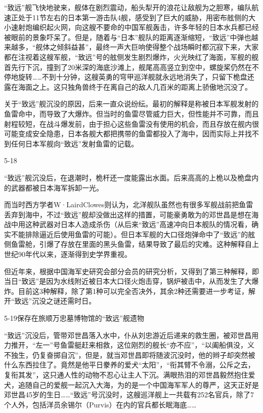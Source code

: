 \documentclass[12pt,UTF8]{ctexbook}
\begin{document}
“致远”舰飞快地驶来，舰体在剧烈震动，船头犁开的浪花让敌舰为之胆寒，编队航速正处于11节左右的日本第一游击队4舰，感受到了巨大的威胁，用密布舷侧的大小速射炮编织起火网，向这艘不要命的中国军舰轰击，许多年轻的日本水兵都已经被眼前的景象吓呆了。但是，随着与“日本”舰队的距离逐渐缩短，“致远”中弹也越来越多，“舰体之倾斜益甚”，最终一声大巨响使得整个战场瞬时都沉寂下来，大家都在注视着这艘军舰，“致远”号的舷侧发生剧烈爆炸，火光映红了海面，军舰的舰首先行下沉，撞到了20米深的海底沙滩上，舰尾高高竖立到空中，螺旋桨仍然在不停地旋转……不到十分钟，这艘英勇的穹甲巡洋舰就永远地消失了，只留下桅盘还露在海面之上。这只独角兽终于在离自己的敌人几百米的距离上骄傲地沉没了。


关于“致远”舰沉没的原因，后来一直众说纷纭。最初的解释是称被日本军舰发射的鱼雷命中，而导致了大爆炸。但当时的鱼雷尽管威力巨大，但性能并不可靠，而且射程较短，在战斗爆发前，由于担心这些鱼雷没有使用的机会，而且存放在舰内很可能变成安全隐患，日本各舰大都把携带的鱼雷都投入了海中，因而实际上并找不到任何日本军舰向“致远”发射鱼雷的记载。

5-18

“致远”舰沉没后，在退潮时，桅杆还一度能露出水面。后来高高的上桅以及桅盘内的武器都被日本海军拆卸一光。

而当时西方学者W·LairdClowes则认为，北洋舰队虽然也有很多军舰战前把鱼雷丢弃到海中，不过“致远”舰却没做出这样的措置，可能豪勇敢为的邓世昌是想在海战中用这种武器对日本人造成杀伤（从后来“致远”高速冲向日本舰队的情况看，确实不能排除逼近后使用鱼雷的可能）。但日本军舰的大口径炮弹命中了“致远”的舷侧鱼雷舱，引爆了存放在里面的黑头鱼雷，结果导致了最后的灾难。这种解释自上世纪90年代以来，逐渐得到史学界重视。

但近年来，根据中国海军史研究会部分会员的研究分析，又得到了第三种解释，即当日“致远”是因为水线附近被日本大口径火炮击穿，锅炉被击中，从而发生了大爆炸。目前这3种解释，除了第1种可以完全否决外，其余2种还需要进一步考证，解开“致远”沉没之谜还需时日。

5-19保存在旅顺万忠墓博物馆的“致远”舰遗物

“致远”沉没后，管带邓世昌落入水中，仆从刘忠游近后递来的救生圈，被邓世昌用力推开，“左一”号鱼雷艇赶来相救，这位刚烈的舰长“亦不应”，“以阖船俱没，义不独生，仍复奋掷自沉”，但是，就当邓世昌即将随波沉没时，他的辫子却突然被什么东西拉住了。竟然是他平日豢养的爱犬“太阳”，“衔其臂不令溺，公斥之去，复衔其发”，这只通人性的动物不忍心让主人下沉。满眼热泪的邓世昌毅然抱住爱犬，追随自己的爱舰一起沉入大海，为的是一个中国海军军人的尊严，这天正好是邓世昌45岁的生日……“致远”号沉没时，这艘巡洋舰上一共载有252名官兵，除了7个人外，包括洋员余锡尔（Purvis）在内的官兵都长眠海底……
\end{document}
